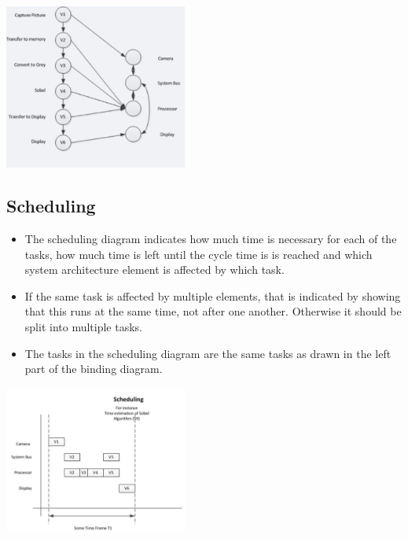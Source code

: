 		\includegraphics[width=0.45\textwidth]{./pictures/bindings.png}
		
	\subsection{Scheduling}
		\begin{itemize}
		  \item The scheduling diagram indicates how much time is necessary for each of the tasks, how much time is left until the cycle time is is reached and which system architecture element is affected by which task.
		  \item If the same task is affected by multiple elements, that is indicated by showing that this runs at the same time, not after one another. Otherwise it should be split into multiple tasks.
		  \item The tasks in the scheduling diagram are the same tasks as drawn in the left part of the binding diagram.
		\end{itemize}
		
		\includegraphics[width=0.45\textwidth]{./pictures/scheduling.png}
		
